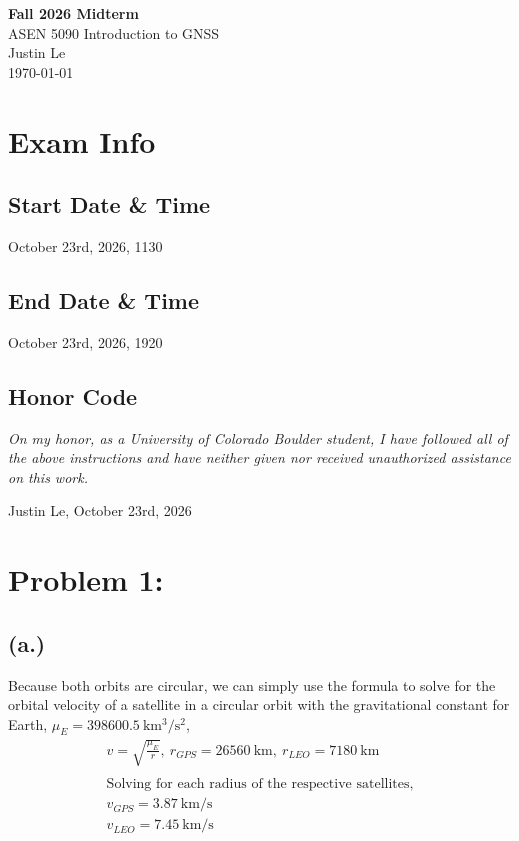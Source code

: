 \documentclass[11pt]{article}
\begin{document}
\begin{center}
    {\Large \textbf{Fall 2026 Midterm}}\\[0.5em]
    {\large ASEN 5090 Introduction to GNSS}\\[0.5em]
    Justin Le\\
    \today
\end{center}

\vspace{1em}

\section*{Exam Info}
\subsection*{Start Date \& Time}
\hspace*{2em}October 23rd, 2026, 1130
\subsection*{End Date \& Time}
\hspace*{2em}October 23rd, 2026, 1920

\subsection*{Honor Code}
\textit{On my honor, as a University of Colorado Boulder student, I have followed all of the above instructions
and have neither given nor received unauthorized assistance on this work.}

\centerline{Justin Le, October 23rd, 2026}

\newpage
\section*{Problem 1:}
\subsection*{(a.)}
\hspace*{2em}Because both orbits are circular, we can simply use the formula to solve for the orbital velocity of a satellite in a circular orbit with the gravitational constant for Earth, $\mu_E =  398600.5~\mathrm{km^3/s^2}$,
\begin{gather*}
v = \sqrt{\frac{\mu_E}{r}},~r_{GPS} = 26560~\mathrm{km},~r_{LEO} = 7180~\mathrm{km} \\
\\
\text{Solving for each radius of the respective satellites,}\\
\boxed{v_{GPS} = 3.87~\mathrm{km/s}} \\
\boxed{v_{LEO} = 7.45~\mathrm{km/s}}
\end{gather*}
\end{document}
